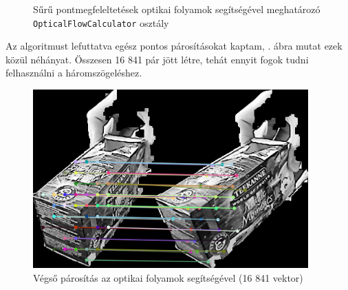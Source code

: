 \begin{figure}[tbh]
\centering


\caption{Sűrű pontmegfeleltetések optikai folyamok segítségével meghatározó \texttt{OpticalFlowCalculator} osztály \label{fig:cd:ofcalc}}
\end{figure}

Az algoritmust lefuttatva egész pontos párosításokat kaptam, . ábra mutat ezek közül néhányat. Összesen 16 841 pár jött létre, tehát ennyit fogok tudni felhasználni a háromszögeléshez. %

\begin{figure}[tbh]
\centering
\includegraphics[width=300pt]{figures/vis_full.png}
\caption{Végső párosítás az optikai folyamok segítségével (16 841 vektor) \label{fig:vis_full}}
\end{figure}

